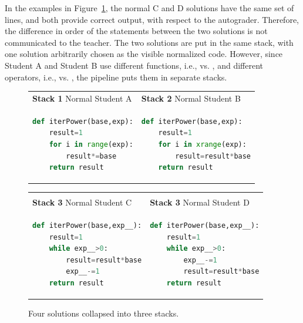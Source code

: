 In the examples in Figure~\ref{fig:makingstacks}, the normal C and D solutions have the same set of lines, and both provide correct output, with respect to the autograder. Therefore, the difference in order of the statements between the two solutions is not communicated to the teacher. The two solutions are put in the same stack, with one solution arbitrarily chosen as the visible normalized code. However, since Student A and Student B use different functions, i.e.,  vs. , and different operators, i.e., \codevar{*=} vs. \codevar{=,*}, the pipeline puts them in separate stacks.
\begin{figure}
\begin{tabular}{l|l}
{\bf Stack 1} Normal Student A & {\bf Stack 2} Normal Student B  \\
\begin{minipage}{0.5\linewidth}
\begin{lstlisting}[basicstyle=\linespread{1.0}\ttfamily\footnotesize,language=python,linebackgroundcolor={\lstcolorlines[gray!20]{3,4}}]
def iterPower(base,exp):
    result=1
    for i in range(exp):
        result*=base
    return result
\end{lstlisting}
\end{minipage}
&
\begin{minipage}{0.5\linewidth}
\begin{lstlisting}[basicstyle=\linespread{1.0}\ttfamily\footnotesize,language=python,linebackgroundcolor={\lstcolorlines[gray!20]{3,4}}]
def iterPower(base,exp):
    result=1
    for i in xrange(exp):
        result=result*base
    return result
\end{lstlisting}
\end{minipage}
\end{tabular}
\begin{tabular}{ll}
\hline
\\
{\bf Stack 3} Normal Student C & {\bf Stack 3} Normal Student D  \\
\begin{minipage}{0.5\linewidth}
\begin{lstlisting}[basicstyle=\linespread{1.0}\ttfamily\footnotesize,language=python,linebackgroundcolor={\lstcolorlines[mygray]{4,5}}]
def iterPower(base,exp__):
    result=1
    while exp__>0:
        result=result*base
        exp__-=1
    return result
\end{lstlisting}
\end{minipage}
&
\begin{minipage}{0.5\linewidth}
\begin{lstlisting}[basicstyle=\linespread{1.0}\ttfamily\footnotesize,language=python,linebackgroundcolor={\lstcolorlines[mygray]{4,5}}]
def iterPower(base,exp__):
    result=1
    while exp__>0:
        exp__-=1
        result=result*base
    return result
\end{lstlisting}
\end{minipage}
\end{tabular}
\caption{Four solutions collapsed into three stacks.}
\label{fig:makingstacks}
\end{figure}
